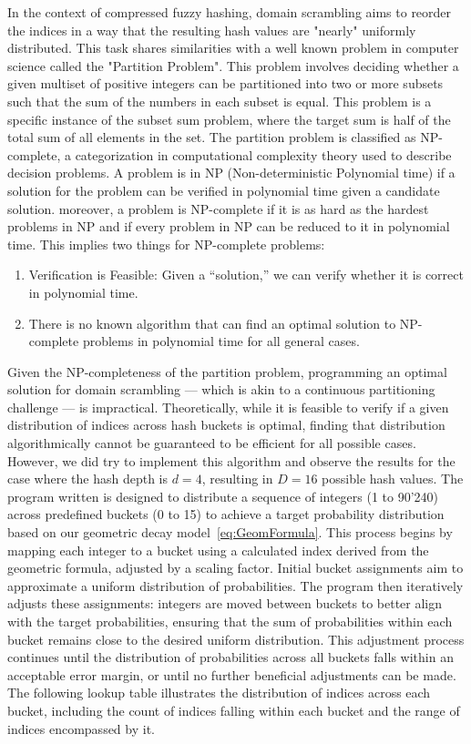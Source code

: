 In the context of compressed fuzzy hashing, domain scrambling aims to reorder the indices in a way that the resulting hash values are "nearly" uniformly distributed. This task shares similarities with a well known problem in computer science called the "Partition Problem". This problem involves deciding whether a given multiset of positive integers can be partitioned into two or more subsets such that the sum of the numbers in each subset is equal. This problem is a specific instance of the subset sum problem, where the target sum is half of the total sum of all elements in the set. The partition problem is classified as NP-complete, a categorization in computational complexity theory used to describe decision problems. A problem is in NP (Non-deterministic Polynomial time) if a solution for the problem can be verified in polynomial time given a candidate solution. moreover, a problem is NP-complete if it is as hard as the hardest problems in NP and if every problem in NP can be reduced to it in polynomial time. This implies two things for NP-complete problems:

\begin{enumerate}
    \item Verification is Feasible: Given a ``solution,'' we can verify whether it is correct in polynomial time.
    \item There is no known algorithm that can find an optimal solution to NP-complete problems in polynomial time for all general cases.
\end{enumerate}

Given the NP-completeness of the partition problem, programming an optimal solution for domain scrambling — which is akin to a continuous partitioning challenge — is impractical. Theoretically, while it is feasible to verify if a given distribution of indices across hash buckets is optimal, finding that distribution algorithmically cannot be guaranteed to be efficient for all possible cases. However, we did try to implement this algorithm and observe the results for the case where the hash depth is \(d=4\), resulting in \(D=16\) possible hash values. The program written is designed to distribute a sequence of integers (1 to 90'240) across predefined buckets (0 to 15) to achieve a target probability distribution based on our geometric decay model~\ref{eq:GeomFormula}. This process begins by mapping each integer to a bucket using a calculated index derived from the geometric formula, adjusted by a scaling factor. Initial bucket assignments aim to approximate a uniform distribution of probabilities. The program then iteratively adjusts these assignments: integers are moved between buckets to better align with the target probabilities, ensuring that the sum of probabilities within each bucket remains close to the desired uniform distribution. This adjustment process continues until the distribution of probabilities across all buckets falls within an acceptable error margin, or until no further beneficial adjustments can be made. The following lookup table illustrates the distribution of indices across each bucket, including the count of indices falling within each bucket and the range of indices encompassed by it.



